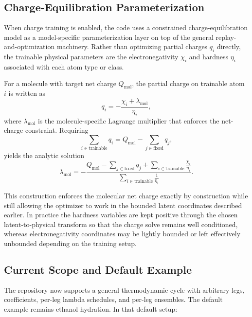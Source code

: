 \subsection{Charge-Equilibration Parameterization}

When charge training is enabled, the code uses a constrained charge-equilibration model as a model-specific parameterization layer on top of the general replay-and-optimization machinery. Rather than optimizing partial charges $q_i$ directly, the trainable physical parameters are the electronegativity $\chi_i$ and hardness $\eta_i$ associated with each atom type or class.

For a molecule with target net charge $Q_{\mathrm{mol}}$, the partial charge on trainable atom $i$ is written as
\begin{equation}
    q_i
    =
    -\frac{\chi_i + \lambda_{\mathrm{mol}}}{\eta_i},
    \label{eq:qi_charge}
\end{equation}
%
where $\lambda_{\mathrm{mol}}$ is the molecule-specific Lagrange multiplier that enforces the net-charge constraint. Requiring
\begin{equation}
    \sum_{i \in \mathrm{trainable}} q_i
    =
    Q_{\mathrm{mol}} - \sum_{j \in \mathrm{fixed}} q_j,
\end{equation}
%
yields the analytic solution
\begin{equation}
    \lambda_{\mathrm{mol}}
    =
    -
    \frac{
        Q_{\mathrm{mol}} - \sum_{j \in \mathrm{fixed}} q_j
        +
        \sum_{i \in \mathrm{trainable}} \frac{\chi_i}{\eta_i}
    }{
        \sum_{i \in \mathrm{trainable}} \frac{1}{\eta_i}
    }.
    \label{eq:lagrange_mol}
\end{equation}

This construction enforces the molecular net charge exactly by construction while still allowing the optimizer to work in the bounded latent coordinates described earlier. In practice the hardness variables are kept positive through the chosen latent-to-physical transform so that the charge solve remains well conditioned, whereas electronegativity coordinates may be lightly bounded or left effectively unbounded depending on the training setup.

\subsection{Current Scope and Default Example}

The repository now supports a general thermodynamic cycle with arbitrary legs, coefficients, per-leg lambda schedules, and per-leg ensembles. The default example remains ethanol hydration. In that default setup:

